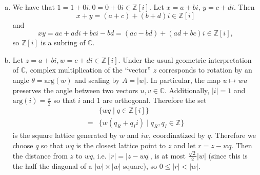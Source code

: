 \documentclass{article}
\begin{document}
\begin{Answer}
  \begin{enumerate}[(a)]
    \item{
      We have that $1 = 1 + 0i, 0 = 0 + 0i \in \mathbb{Z}[i]$.
      Let $x = a + bi$, $y = c + di$. Then
      $$
      x + y = (a + c) + (b + d)i \in \mathbb{Z}[i]
      $$
      and
      $$
      xy = ac + adi + bci - bd = (ac - bd) + (ad + bc)i
        \in \mathbb{Z}[i],
      $$
      so $\mathbb{Z}[i]$ is a subring of $\mathbb{C}$.
    }
    \item{
      Let $z = a + bi, w = c + di \in \mathbb{Z}[i]$.
      Under the usual geometric interpretation of $\mathbb{C}$,
      complex multiplication of the ``vector'' $z$ corresponds
      to rotation by an  angle $\theta = \mathrm{arg}(w)$ and scaling
      by $A = |w|$. In particular, the map $u \mapsto wu$ preserves
      the angle between two vectors $u, v \in \mathbb{C}$. Additionally,
      $|i| = 1$ and  $\mathrm{arg}(i) = \frac{\pi}{2}$ so that $i$ and $1$ are
      orthogonal. Therefore the set
     \begin{align*}
            & \{ w q \mid q \in \mathbb{Z}[i] \} \\
     =      & \{ w (q_R + q_I i) \mid q_R, q_I \in \mathbb{Z} \}
     \end{align*}
     is the square lattice generated by $w$ and $iw$, coordinatized by
     $q$. Therefore we choose $q$ so that $wq$ is the closest lattice
     point to $z$ and let $r = z - wq$. Then the distance from
     $z$ to $wq$, i.e. $|r| = |z - wq|$, is at most
     $\frac{\sqrt{2}}{2}|w|$ (since this is the half the diagonal of
     a $|w| \times |w|$ square), so $0 \leq |r| < |w|$.

}
\end{enumerate}
\end{Answer}
\end{document}
